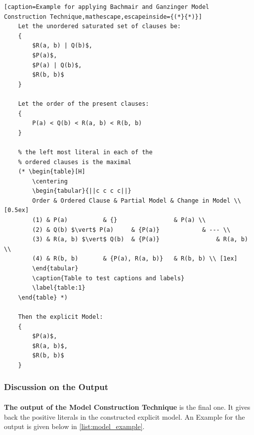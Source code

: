 			\begin{minipage}{\textwidth}
			\begin{lstlisting}[caption=Example for applying Bachmair and Ganzinger Model Construction Technique,mathescape,escapeinside={(*}{*)}]
	Let the unordered saturated set of clauses be:
	{
		$R(a, b) | Q(b)$,
		$P(a)$,
		$P(a) | Q(b)$,
		$R(b, b)$
	}
	
	Let the order of the present clauses:
	{
		P(a) < Q(b) < R(a, b) < R(b, b)
	}			

	% the left most literal in each of the
	% ordered clauses is the maximal
	(* \begin{table}[H]
		\centering
		\begin{tabular}{||c c c c||}
 		Order & Ordered Clause & Partial Model & Change in Model \\ [0.5ex] 
 		(1) & P(a) 			& {} 				& P(a) \\ 
 		(2) & Q(b) $\vert$ P(a)  	& {P(a)} 			& --- \\
 		(3) & R(a, b) $\vert$ Q(b)	& {P(a)}		 		& R(a, b) \\
 		(4) & R(b, b) 		& {P(a), R(a, b)} 	& R(b, b) \\ [1ex]
		\end{tabular}
		\caption{Table to test captions and labels}
		\label{table:1}
	\end{table} *)
		
	Then the explicit Model:
	{
		$P(a)$,
		$R(a, b)$,
		$R(b, b)$	
	}		
			\end{lstlisting}
			\end{minipage}
		
		
	

	\subsubsection{Discussion on the Output}
		\paragraph{}		
		\textbf{The output of the Model Construction Technique} is the final one. It gives back the positive literals in the constructed explicit model. An Example for the output is given below in \ref{list:model_example}.
		
